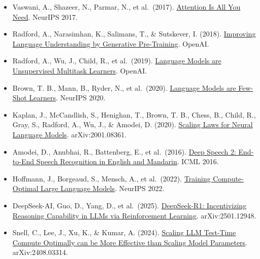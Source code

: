 \vspace{0.25em}
\begin{itemize}
\tightlist
\item
  Vaswani, A., Shazeer, N., Parmar, N., et al.~(2017). \href{https://arxiv.org/abs/1706.03762}{Attention Is All You Need}. NeurIPS 2017.
\item
  Radford, A., Narasimhan, K., Salimans, T., \& Sutskever, I. (2018). \href{https://cdn.openai.com/research-covers/language-unsupervised/language_understanding_paper.pdf}{Improving Language Understanding by Generative Pre-Training}. OpenAI.
\item
  Radford, A., Wu, J., Child, R., et al.~(2019). \href{https://cdn.openai.com/better-language-models/language_models_are_unsupervised_multitask_learners.pdf}{Language Models are Unsupervised Multitask Learners}. OpenAI.
\item
  Brown, T. B., Mann, B., Ryder, N., et al.~(2020). \href{https://arxiv.org/abs/2005.14165}{Language Models are Few-Shot Learners}. NeurIPS 2020.
\item
  Kaplan, J., McCandlish, S., Henighan, T., Brown, T. B., Chess, B., Child, R., Gray, S., Radford, A., Wu, J., \& Amodei, D. (2020). \href{https://arxiv.org/abs/2001.08361}{Scaling Laws for Neural Language Models}. arXiv:2001.08361.
\item
  Amodei, D., Anubhai, R., Battenberg, E., et al.~(2016). \href{https://arxiv.org/abs/1512.02595}{Deep Speech 2: End-to-End Speech Recognition in English and Mandarin}. ICML 2016.
\item
  Hoffmann, J., Borgeaud, S., Mensch, A., et al.~(2022). \href{https://arxiv.org/abs/2203.15556}{Training Compute-Optimal Large Language Models}. NeurIPS 2022.
\item
  DeepSeek-AI, Guo, D., Yang, D., et al.~(2025). \href{https://arxiv.org/abs/2501.12948}{DeepSeek-R1: Incentivizing Reasoning Capability in LLMs via Reinforcement Learning}. arXiv:2501.12948.
\item
  Snell, C., Lee, J., Xu, K., \& Kumar, A. (2024). \href{https://arxiv.org/abs/2408.03314}{Scaling LLM Test-Time Compute Optimally can be More Effective than Scaling Model Parameters}. arXiv:2408.03314.
\end{itemize}

\clearpage
